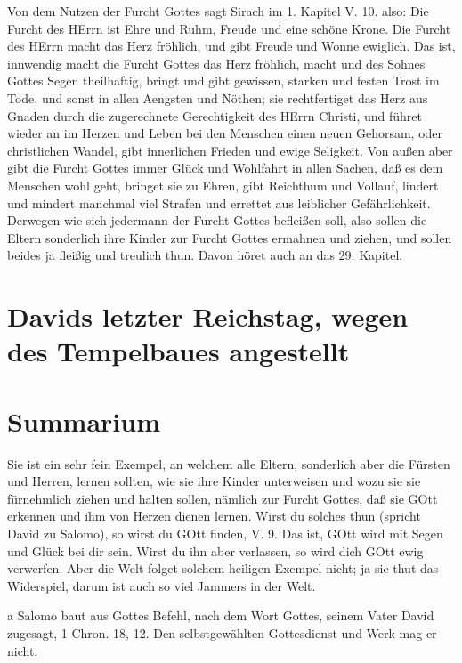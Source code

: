 Von dem Nutzen der Furcht Gottes sagt Sirach im 1. Kapitel V. 10. also: Die Furcht des HErrn ist Ehre und Ruhm, Freude und eine schöne Krone. Die Furcht des HErrn macht das Herz fröhlich, und gibt Freude und Wonne ewiglich. Das ist, innwendig macht die Furcht Gottes das Herz fröhlich, macht und des Sohnes Gottes Segen theilhaftig, bringt und gibt gewissen, starken und festen Trost im Tode, und sonst in allen Aengsten und Nöthen; sie rechtfertiget das Herz aus Gnaden durch die zugerechnete Gerechtigkeit des HErrn Christi, und führet wieder an im Herzen und Leben bei den Menschen einen neuen Gehorsam, oder christlichen Wandel, gibt innerlichen Frieden und ewige Seligkeit. Von außen aber gibt die Furcht Gottes immer Glück und Wohlfahrt in allen Sachen, daß es dem Menschen wohl geht, bringet sie zu Ehren, gibt Reichthum und Vollauf, lindert und mindert manchmal viel Strafen und errettet aus leiblicher Gefährlichkeit. Derwegen wie sich jedermann der Furcht Gottes befleißen soll, also sollen die Eltern sonderlich ihre Kinder zur Furcht Gottes ermahnen und ziehen, und sollen beides ja fleißig und treulich thun. Davon höret auch an das 29. Kapitel.

\section[Davids letzter Reichstag, wegen des Tempelbaues angestellt]{Davids letzter Reichstag, wegen des Tempelbaues angestellt}

\section{Summarium}

Sie ist ein sehr fein Exempel, an welchem alle Eltern, sonderlich aber die Fürsten und Herren, lernen sollten, wie sie ihre Kinder unterweisen und wozu sie sie fürnehmlich ziehen und halten sollen, nämlich zur Furcht Gottes, daß sie GOtt erkennen und ihm von Herzen dienen lernen. Wirst du solches thun (spricht David zu Salomo), so wirst du GOtt finden, V. 9. Das ist, GOtt wird mit Segen und Glück bei dir sein. Wirst du ihn aber verlassen, so wird dich GOtt ewig verwerfen. Aber die Welt folget solchem heiligen Exempel nicht; ja sie thut das Widerspiel, darum ist auch so viel Jammers in der Welt.

a Salomo baut aus Gottes Befehl, nach dem Wort Gottes, seinem Vater David zugesagt, 1 Chron. 18, 12. Den selbstgewählten Gottesdienst und Werk mag er nicht.

